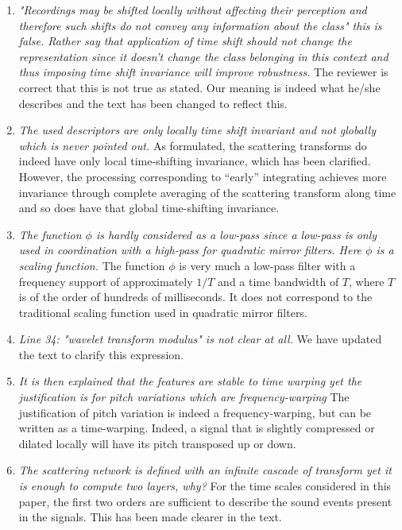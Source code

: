 \documentclass[10pt]{article}
\begin{document}
\begin{enumerate}
\item \emph{"Recordings may be shifted locally 
without affecting their perception and therefore such shifts do not convey any information about the class" this is false. Rather say that application of time shift should not change the representation since it doesn't change the class belonging in this context and thus imposing time shift invariance will improve robustness.}
The reviewer is correct that this is not true as stated. Our meaning is indeed what he/she describes and the text has been changed to reflect this.

\item \emph{The used descriptors are only locally time shift invariant and not globally which is never pointed out.}
As formulated, the scattering transforms do indeed have only local time-shifting invariance, which has been clarified. However, the processing corresponding to ``early'' integrating achieves more invariance through complete averaging of the scattering transform along time and so does have that global time-shifting invariance.

\item \emph{The function $\phi$ is hardly considered as a low-pass since a low-pass is only used in coordination with a high-pass for quadratic mirror filters. Here $\phi$ is a scaling function.}
The function $\phi$ is very much a low-pass filter with a frequency support of approximately $1/T$ and a time bandwidth of $T$, where $T$ is of the order of hundreds of milliseconds. It does not correspond to the traditional scaling function used in quadratic mirror filters.

\item \emph{Line 34: "wavelet transform modulus" is not clear at all.}
We have updated the text to clarify this expression.

\item \emph{It is then explained that the features are stable to time warping yet the justification is for pitch variations which are frequency-warping}
The justification of pitch variation is indeed a frequency-warping, but can be written as a time-warping. Indeed, a signal that is slightly compressed or dilated locally will have its pitch transposed up or down.

\item \emph{The scattering network is defined with an infinite cascade of transform yet it is enough to compute two layers, why?}
For the time scales considered in this paper, the first two orders are sufficient to describe the sound events present in the signals. This has been made clearer in the text.


\end{enumerate}
\end{document}
